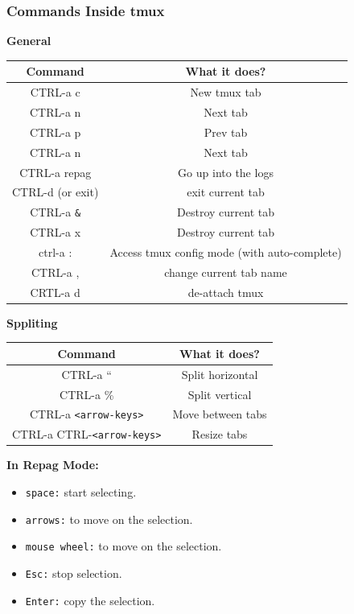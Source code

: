 \documentclass{article}
\begin{document}
\subsubsection{Commands Inside tmux}
\textbf{General}
\begin{table}[H]
\begin{tabular}{| c  |c  |}
\hline
\textbf{Command} & \textbf{What it does?} \\ \hline
CTRL-a c & New tmux tab \\
CTRL-a n & Next tab \\
CTRL-a p & Prev tab \\
CTRL-a n & Next tab \\
CTRL-a repag & Go up into the logs \\
CTRL-d (or exit) & exit current tab \\
CTRL-a \verb|&| & Destroy current tab \\
CTRL-a x & Destroy current tab \\
ctrl-a : & Access tmux config mode (with auto-complete) \\
CTRL-a , & change current tab name \\
CRTL-a d & de-attach tmux \\
\hline
\end{tabular}
\end{table}

\textbf{Sppliting}
\begin{table}[H]
\begin{tabular}{| c  |c  |}
\hline
\textbf{Command} & \textbf{What it does?} \\ \hline
CTRL-a “ & Split horizontal \\
CTRL-a \% & Split vertical \\
CTRL-a \verb|<arrow-keys>| & Move between tabs \\
CTRL-a CTRL-\verb|<arrow-keys>| & Resize tabs \\
\hline
\end{tabular}
\end{table}

\textbf{In Repag Mode:}
\begin{itemize}
    \item \verb|space:| start selecting.
    \item \verb|arrows:| to move on the selection.
    \item \verb|mouse wheel:| to move on the selection.
    \item \verb|Esc:| stop selection.
    \item \verb|Enter:| copy the selection.
\end{itemize}
\end{document}
